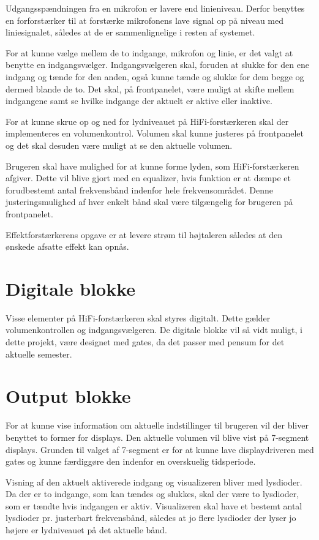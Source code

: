 Udgangsspændningen fra en mikrofon er lavere end linieniveau. Derfor benyttes en forforstærker til at forstærke mikrofonens lave signal op på niveau med liniesignalet, således at de er sammenlignelige i resten af systemet.

For at kunne vælge mellem de to indgange, mikrofon og linie, er det valgt at benytte en indgangsvælger. Indgangsvælgeren skal, foruden at slukke for den ene indgang og tænde for den anden, også kunne tænde og slukke for dem begge og dermed blande de to. Det skal, på frontpanelet, være muligt at skifte mellem indgangene samt se hvilke indgange der aktuelt er aktive eller inaktive. 

For at kunne skrue op og ned for lydniveauet på HiFi-forstærkeren skal der implementeres en volumenkontrol. Volumen skal kunne justeres på frontpanelet og det skal desuden være muligt at se den aktuelle volumen. 

Brugeren skal have mulighed for at kunne forme lyden, som HiFi-forstærkeren afgiver. Dette vil blive gjort med en equalizer, hvis funktion er at dæmpe et forudbestemt antal frekvensbånd indenfor hele frekvensområdet. Denne justeringsmulighed af hver enkelt bånd skal være tilgængelig for brugeren på frontpanelet. 

Effektforstærkerens opgave er at levere strøm til højtaleren således at den ønskede afsatte effekt kan opnås.

\section*{Digitale blokke}
Visse elementer på HiFi-forstærkeren skal styres digitalt. Dette gælder volumenkontrollen og indgangsvælgeren. De digitale blokke vil så vidt muligt, i dette projekt, være designet med gates, da det passer med pensum for det aktuelle semester. 


\section*{Output blokke}

For at kunne vise information om aktuelle indstillinger til brugeren vil der bliver benyttet to former for displays. 
Den aktuelle volumen vil blive vist på 7-segment displays. Grunden til valget af 7-segment er for at kunne lave displaydriveren med gates og kunne færdiggøre den indenfor en overskuelig tidsperiode. 

Visning af den aktuelt aktiverede indgang og visualizeren bliver med lysdioder. Da der er to indgange, som kan tændes og slukkes, skal der være to lysdioder, som er tændte hvis indgangen er aktiv. Visualizeren skal have et bestemt antal lysdioder pr. justerbart frekvensbånd, således at jo flere lysdioder der lyser jo højere er lydniveauet på det aktuelle bånd.